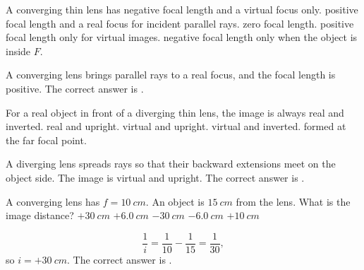 \documentclass[full,print,11pt,a4paper]{physicsquiz}
\begin{document}
\begin{quizbank}
  \begin{quizquestion}[
    id=optics-lens-010,
    topic=thin-lenses,
    difficulty=foundation,
    marks=1,
    correct=B,
    tags={converging-lens,focus},
    outcome={Identify converging lens focal sign}
  ]
    A converging thin lens has
    \choices
      {negative focal length and a virtual focus only.}
      {positive focal length and a real focus for incident parallel rays.}
      {zero focal length.}
      {positive focal length only for virtual images.}
      {negative focal length only when the object is inside \(F\).}
  \end{quizquestion}
  \begin{quizsolution}
    A converging lens brings parallel rays to a real focus, and the focal length
    is positive. The correct answer is \quizcorrectletter.
  \end{quizsolution}

  \begin{quizquestion}[
    id=optics-lens-011,
    topic=thin-lenses,
    difficulty=foundation,
    marks=1,
    correct=C,
    tags={diverging-lens,image-type},
    outcome={Recall the image formed by a diverging lens}
  ]
    For a real object in front of a diverging thin lens, the image is always
    \choices
      {real and inverted.}
      {real and upright.}
      {virtual and upright.}
      {virtual and inverted.}
      {formed at the far focal point.}
  \end{quizquestion}
  \begin{quizsolution}
    A diverging lens spreads rays so that their backward extensions meet on the
    object side. The image is virtual and upright. The correct answer is
    \quizcorrectletter.
  \end{quizsolution}

  \begin{quizquestion}[
    id=optics-lens-012,
    topic=thin-lenses,
    difficulty=applied,
    marks=1,
    correct=A,
    tags={thin-lens-equation,calculation},
    outcome={Use the thin lens equation}
  ]
    A converging lens has \(f=\SI{10}{cm}\). An object is
    \(\SI{15}{cm}\) from the lens. What is the image distance?
    \choices
      {\(+\SI{30}{cm}\)}
      {\(+\SI{6.0}{cm}\)}
      {\(-\SI{30}{cm}\)}
      {\(-\SI{6.0}{cm}\)}
      {\(+\SI{10}{cm}\)}
  \end{quizquestion}
  \begin{quizsolution}
    \[
      \frac{1}{i}=\frac{1}{10}-\frac{1}{15}=\frac{1}{30},
    \]
    so \(i=+\SI{30}{cm}\). The correct answer is \quizcorrectletter.
  \end{quizsolution}


\end{quizbank}
\end{document}
